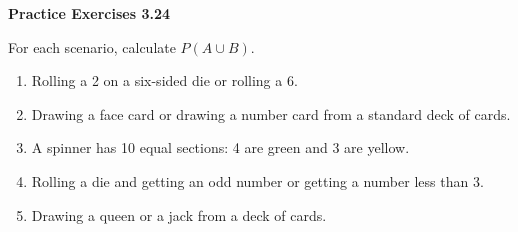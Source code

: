 \vspace{0.3ex}
\noindent\textbf{Practice Exercises 3.24}

\vspace{0.2ex}

For each scenario, calculate \( P(A \cup B) \).

\begin{enumerate}[label=\color{blue}\arabic*.]
    \item Rolling a 2 on a six-sided die or rolling a 6.
    \item Drawing a face card or drawing a number card from a standard deck of cards.
    \item A spinner has 10 equal sections: 4 are green and 3 are yellow.
    \item Rolling a die and getting an odd number or getting a number less than 3.
    \item Drawing a queen or a jack from a deck of cards.
\end{enumerate}
